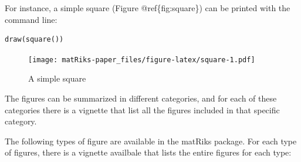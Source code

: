 For instance, a simple square (Figure @ref\{fig:square\}) can be printed with the command line:

\begin{verbatim}
draw(square())
\end{verbatim}

\begin{figure}
\centering
\texttt{[image: matRiks-paper\_files/figure-latex/square-1.pdf]}
\caption{\label{fig:square}A simple square}
\end{figure}

The figures can be summarized in different categories, and for each of these categories there is a vignette that list all the figures included in that specific category.

The following types of figure are available in the matRiks package. For each type of figures, there is a vignette availbale that lists the entire figures for each type:

